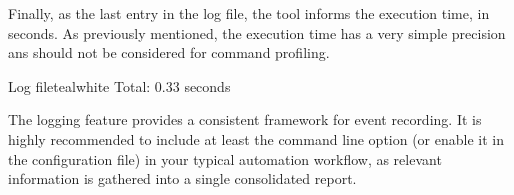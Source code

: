 Finally, as the last entry in the log file, the tool informs the execution time, in seconds. As previously mentioned, the execution time has a very simple precision ans should not be considered for command profiling.

\begin{codebox}{Log file}{teal}{\icnote}{white}
Total: 0.33 seconds
\end{codebox}

The logging feature provides a consistent framework for event recording. It is highly recommended to include at least the  command line option (or enable it in the configuration file) in your typical automation workflow, as relevant information is gathered into a single consolidated report.